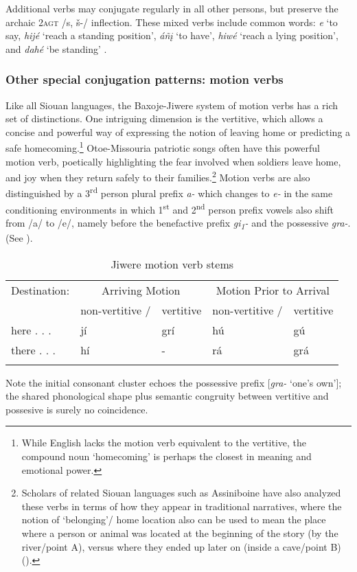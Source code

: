 \documentclass[output=paper]{LSP/langsci}
\begin{document}
Additional verbs may conjugate regularly in all other persons, but preserve the archaic \textsc{2agt} /s, \v{s}-/ inflection.  These mixed verbs include common words: \textit{e} `to say, \textit{hij\'e} `reach a standing position', \textit{á\~n\k{i}} `to have', \textit{hiw\'e} `reach  a lying position', and \textit{dah\'e} `be standing' \citep[243]{Whitman1946}.

\subsubsection{Other special conjugation patterns:  motion verbs} 	               		                   
Like all Siouan languages, the Baxoje-Jiwere system of motion verbs has a rich set of distinctions. One intriguing dimension is the vertitive, which allows a concise and powerful way of expressing the notion of leaving home or predicting a safe homecoming.\footnote{While English lacks the motion verb equivalent to the vertitive, the compound noun `homecoming' is perhaps the closest in meaning and emotional power.}  Otoe-Missouria patriotic songs often have this powerful motion verb, poetically highlighting the fear involved when soldiers leave home, and joy when they return safely to their families.\footnote{Scholars of related Siouan languages such as Assiniboine have also analyzed these verbs in terms of how they appear in traditional narratives, where the notion of `belonging'/ home location also can be used to mean the place where a person or animal was located at the beginning of the story (by the river/point A), versus where they ended up later on (inside a cave/point B) (\citealt{Cumberland2005}).} Motion verbs are also distinguished by a 3\textsuperscript{rd} person plural prefix \textit{a-} which changes to \textit{e-} in the same conditioning environments in which 1\textsuperscript{st} and 2\textsuperscript{nd} person prefix vowels also shift from /a/ to /e/, namely before the benefactive prefix \textit{gi\textsubscript{1}-} and the possessive \textit{gra-}. (See ).

\begin{table} 
\begin{tabular}{ l l l l l }
\lsptoprule
 Destination: & \multicolumn{2}{c}{Arriving Motion} & \multicolumn{2}{c}{Motion Prior to Arrival} \\
& non-vertitive / & vertitive & non-vertitive / & vertitive \\
\midrule
here . . . 	& j\'i  & gr\'i & hú &  gú \\
there . . . 	& h\'i &   -  & rá & grá \\
\lspbottomrule
\end{tabular}
\caption{Jiwere motion verb stems \citep[293]{Taylor1976}} \label{motionverb}
\end{table}
Note the initial consonant cluster echoes the possessive prefix [\textit{gra-} `one's own']; the shared phonological shape plus semantic congruity between vertitive and possesive is surely no coincidence.  
\end{document}
